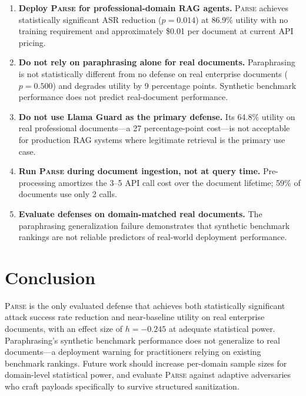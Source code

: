 \documentclass[11pt]{article}
\newcommand{\parse}{\textsc{Parse}\xspace}
\begin{document}
\begin{enumerate}

\item \textbf{Deploy \parse for professional-domain RAG agents.}
  \parse achieves statistically significant ASR reduction ($p{=}0.014$)
  at 86.9\% utility with no training requirement and approximately
  \$0.01 per document at current API pricing.

\item \textbf{Do not rely on paraphrasing alone for real documents.}
  Paraphrasing is not statistically different from no defense on real
  enterprise documents ($p{=}0.500$) and degrades utility by 9
  percentage points.
  Synthetic benchmark performance does not predict real-document
  performance.

\item \textbf{Do not use Llama Guard as the primary defense.}
  Its 64.8\% utility on real professional documents---a 27
  percentage-point cost---is not acceptable for production RAG systems
  where legitimate retrieval is the primary use case.

\item \textbf{Run \parse during document ingestion, not at query time.}
  Pre-processing amortizes the 3--5 API call cost over the document
  lifetime; 59\% of documents use only 2 calls.

\item \textbf{Evaluate defenses on domain-matched real documents.}
  The paraphrasing generalization failure demonstrates that synthetic
  benchmark rankings are not reliable predictors of real-world
  deployment performance.

\end{enumerate}

\section{Conclusion}

\parse is the only evaluated defense that achieves both statistically
significant attack success rate reduction and near-baseline utility on
real enterprise documents, with an effect size of $h{=}{-}0.245$ at
adequate statistical power.
Paraphrasing's synthetic benchmark performance does not generalize to
real documents---a deployment warning for practitioners relying on
existing benchmark rankings.
Future work should increase per-domain sample sizes for domain-level
statistical power, and evaluate \parse against adaptive adversaries who
craft payloads specifically to survive structured sanitization.
\end{document}
